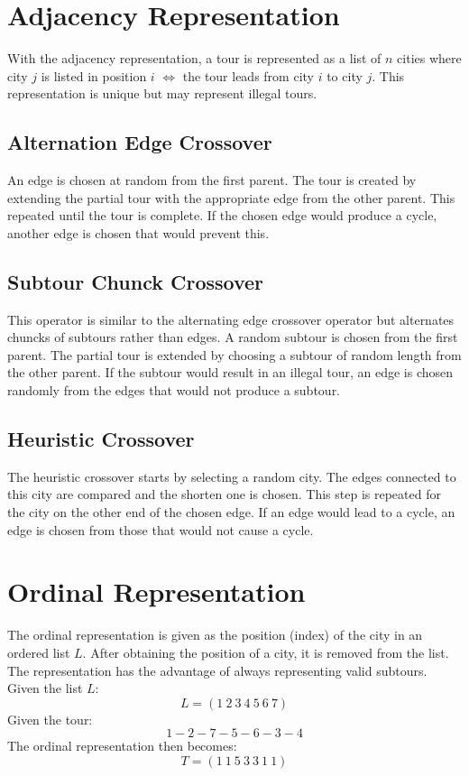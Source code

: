 \documentclass[../main.tex]{subfiles}
\begin{document}
\section{Adjacency Representation}
With the adjacency representation, a tour is represented as a list of $n$ cities where city $j$ is listed in position $i$ $\Leftrightarrow$ the tour leads from city $i$ to city $j$. This representation is unique but may represent illegal tours.

\subsection{Alternation Edge Crossover}

An edge is chosen at random from the first parent. The tour is created by extending the partial tour with the appropriate edge from the other parent. This repeated until the tour is complete. If the chosen edge would produce a cycle, another edge is chosen that would prevent this.

\subsection{Subtour Chunck Crossover}

This operator is similar to the alternating edge crossover operator but alternates chuncks of subtours rather than edges. A random subtour is chosen from the first parent. The partial tour is extended by choosing a subtour of random length from the other parent. If the subtour would result in an illegal tour, an edge is chosen randomly from the edges that would not produce a subtour.

\subsection{Heuristic Crossover}

The heuristic crossover starts by selecting a random city. The edges connected to this city are compared and the shorten one is chosen. This step is repeated for the city on the other end of the chosen edge. If an edge would lead to a cycle, an edge is chosen from those that would not cause a cycle.

\section{Ordinal Representation}

The ordinal representation is given as the position (index) of the city in an ordered list $L$. After obtaining the position of a city, it is removed from the list. The representation has the advantage of always representing valid subtours.
Given the list $L$:
\[
L = (1 ~ 2 ~ 3 ~ 4 ~ 5 ~ 6 ~ 7)
\]
Given the tour:
\[
1 - 2 -7 -5 -6 -3-4
\]
The ordinal representation then becomes:
\[
T = (1 ~ 1 ~ 5 ~ 3 ~ 3 ~ 1 ~ 1)
\]
\end{document}
